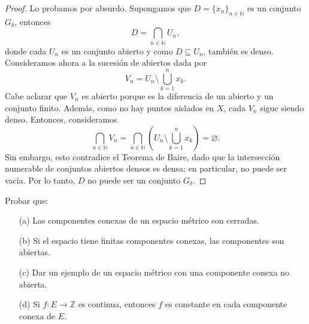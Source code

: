 \begin{proof}
    Lo probamos por absurdo. Supongamos que $D = \{x_n\}_{n \in \mathbb{N}}$ es un conjunto $G_\delta$, entonces
    \begin{equation*}
        D = \bigcap_{n \in \mathbb{N}} U_n,
    \end{equation*}
    donde cada $U_n$ es un conjunto abierto y como $D \subseteq U_n$, también es denso. Consideramos ahora a la sucesión de abiertos dada por
    \begin{equation*}
        V_n = U_n \setminus \bigcup_{k=1}^{n} x_k.
    \end{equation*}
    Cabe aclarar que $V_n$ es abierto porque es la diferencia de un abierto y un conjunto finito. Además, como no hay puntos aislados en $X$, cada $V_n$ sigue siendo denso. Entonces, consideramos
    \begin{equation*}
        \bigcap_{n \in \mathbb{N}} V_n = \bigcap_{n \in \mathbb{N}} (U_n \setminus \bigcup_{k=1}^{n} x_k) = \varnothing.
    \end{equation*}
    Sin embargo, esto contradice el Teorema de Baire, dado que la intersección numerable de conjuntos abiertos densos es densa; en particular, no puede ser vacía. Por lo tanto, $D$ no puede ser un conjunto $G_\delta$.
\end{proof}

\begin{exercise}
    Probar que:
    \begin{enumerate}
        \item[(a)] Las componentes conexas de un espacio métrico son cerradas.
        \item[(b)] Si el espacio tiene finitas componentes conexas, las componentes son abiertas.
        \item[(c)] Dar un ejemplo de un espacio métrico con una componente conexa no abierta.
        \item[(d)] Si $f : E \to \mathbb{Z}$ es continua, entonces $f$ es constante en cada componente conexa de $E$.
    \end{enumerate}
\end{exercise}

